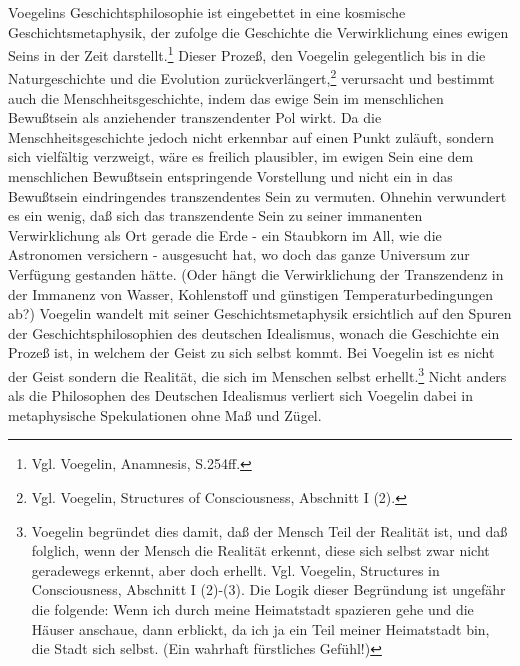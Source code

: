 Voegelins Geschichtsphilosophie ist eingebettet in eine kosmische
Geschichtsmetaphysik, der zufolge die Geschichte die Verwirklichung eines
ewigen Seins in der Zeit darstellt.\footnote{Vgl. Voegelin, Anamnesis,
  S.254ff.} Dieser Prozeß, den Voegelin gelegentlich bis in die
Naturgeschichte und die Evolution zurückverlängert,\footnote{Vgl. Voegelin,
  Structures of Consciousness, Abschnitt I (2).} verursacht und bestimmt auch
die Menschheitsgeschichte, indem das ewige Sein im menschlichen Bewußtsein als
anziehender transzendenter Pol wirkt. Da die Menschheitsgeschichte jedoch
nicht erkennbar auf einen Punkt zuläuft, sondern sich vielfältig verzweigt,
wäre es freilich plausibler, im ewigen Sein eine dem menschlichen Bewußtsein
entspringende Vorstellung und nicht ein in das Bewußtsein eindringendes
transzendentes Sein zu vermuten. Ohnehin verwundert es ein wenig, daß sich das
transzendente Sein zu seiner immanenten Verwirklichung als Ort gerade die Erde
- ein Staubkorn im All, wie die Astronomen versichern - ausgesucht hat, wo
doch das ganze Universum zur Verfügung gestanden hätte. (Oder hängt die
Verwirklichung der Transzendenz in der Immanenz von Wasser, Kohlenstoff und
günstigen Temperaturbedingungen ab?)  Voegelin wandelt mit seiner
Geschichtsmetaphysik ersichtlich auf den Spuren der Geschichtsphilosophien des
deutschen Idealismus, wonach die Geschichte ein Prozeß ist, in welchem der
Geist zu sich selbst kommt. Bei Voegelin ist es nicht der Geist sondern die
Realität, die sich im Menschen selbst erhellt.\footnote{Voegelin begründet
  dies damit, daß der Mensch Teil der Realität ist, und daß folglich, wenn der
  Mensch die Realität erkennt, diese sich selbst zwar nicht geradewegs
  erkennt, aber doch erhellt. Vgl.  Voegelin, Structures in Consciousness,
  Abschnitt I (2)-(3).  Die Logik dieser Begründung ist ungefähr die folgende:
  Wenn ich durch meine Heimatstadt spazieren gehe und die Häuser anschaue,
  dann erblickt, da ich ja ein Teil meiner Heimatstadt bin, die Stadt sich
  selbst.  (Ein wahrhaft fürstliches Gefühl!)} Nicht anders als die
Philosophen des Deutschen Idealismus verliert sich Voegelin dabei in
metaphysische Spekulationen ohne Maß und Zügel.

